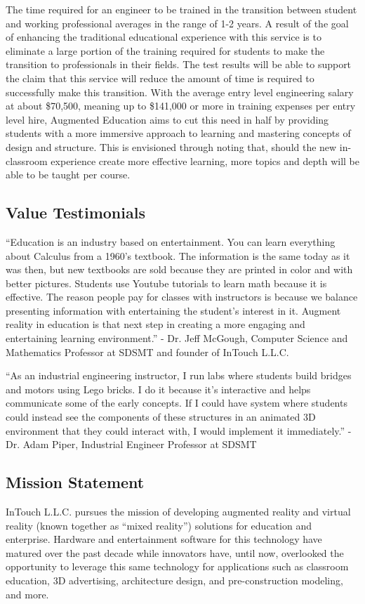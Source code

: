 The time required for an engineer to be trained in the transition between student and working professional averages in the range of 1-2 years. A result of the goal of enhancing the traditional educational experience with this service is to eliminate a large portion of the training required for students to make the transition to professionals in their fields. The test results will be able to support the claim that this service will reduce the amount of time is required to successfully make this transition.  With the average entry level engineering salary at about \$70,500, meaning up to \$141,000 or more in training expenses per entry level hire, Augmented Education aims to cut this need in half by providing students with a more immersive approach to learning and mastering concepts of design and structure. This is envisioned through noting that, should the new in-classroom experience create more effective learning, more topics and depth will be able to be taught per course. 

\subsection{Value Testimonials}
“Education is an industry based on entertainment. You can learn everything about Calculus from a 1960’s textbook. The information is the same today as it was then, but new textbooks are sold because they are printed in color and with better pictures. Students use Youtube tutorials to learn math because it is effective. The reason people pay for classes with instructors is because we balance presenting information with entertaining the student’s interest in it. Augment reality in education is that next step in creating a more engaging and entertaining learning environment.” - Dr. Jeff McGough, Computer Science and Mathematics Professor at SDSMT and founder of InTouch L.L.C.

“As an industrial engineering instructor, I run labs where students build bridges and motors using Lego bricks. I do it because it's interactive and helps communicate some of the early concepts. If I could  have system where students could instead see the components of these structures in an animated 3D environment that they could interact with, I would implement it immediately.” - Dr. Adam Piper, Industrial Engineer Professor at SDSMT



\subsection{Mission Statement}
InTouch L.L.C. pursues the mission of developing augmented reality and virtual reality (known together as “mixed reality”) solutions for education and enterprise. Hardware and entertainment software for this technology have matured over the past decade while innovators have, until now, overlooked the opportunity to leverage this same technology for applications such as classroom education, 3D advertising, architecture design, and pre-construction modeling, and more.  

